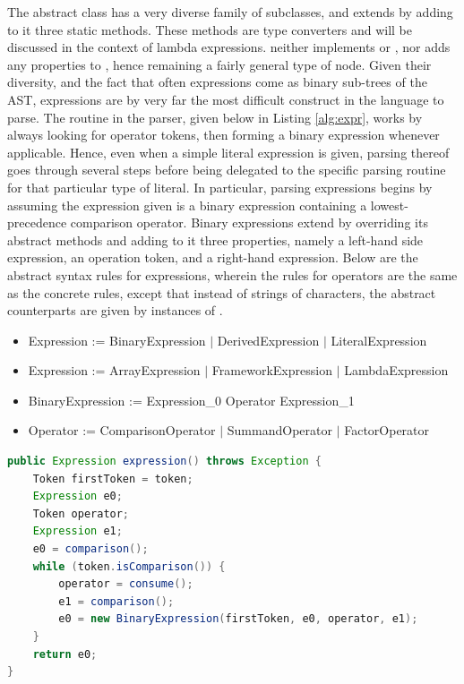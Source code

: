 The abstract class  has a very diverse family of subclasses, and extends  by adding to it three static methods. These methods are type converters and will be discussed in the context of lambda expressions.  neither implements  or , nor adds any properties to , hence remaining a fairly general type of node. Given their diversity, and the fact that often expressions come as binary sub-trees of the AST, expressions are by very far the most difficult construct in the language to parse. The  routine in the parser, given below in Listing \ref{alg:expr}, works by always looking for operator tokens, then forming a binary expression whenever applicable. Hence, even when a simple literal expression is given, parsing thereof goes through several steps before being delegated to the specific parsing routine for that particular type of literal. In particular, parsing expressions begins by assuming the expression given is a binary expression containing a lowest-precedence comparison operator. Binary expressions extend  by overriding its abstract methods and adding to it three properties, namely a left-hand side expression, an operation token, and a right-hand expression. Below are the abstract syntax rules for expressions, wherein the rules for operators are the same as the concrete rules, except that instead of strings of characters, the abstract counterparts are given by instances of .

\begin{itemize}
	\item Expression := BinaryExpression $|$ DerivedExpression $|$ LiteralExpression
	\item Expression := ArrayExpression $|$ FrameworkExpression $|$ LambdaExpression
	\item BinaryExpression := Expression\_0 Operator Expression\_1
	\item Operator := ComparisonOperator $|$ SummandOperator $|$ FactorOperator
\end{itemize}

\begin{lstlisting}[language=Java,caption={Parsing Expressions.},label={alg:expr}]
public Expression expression() throws Exception {
	Token firstToken = token;
	Expression e0;
	Token operator;
	Expression e1;
	e0 = comparison();
	while (token.isComparison()) {
		operator = consume();
		e1 = comparison();
		e0 = new BinaryExpression(firstToken, e0, operator, e1);
	}
	return e0;
}
\end{lstlisting}

